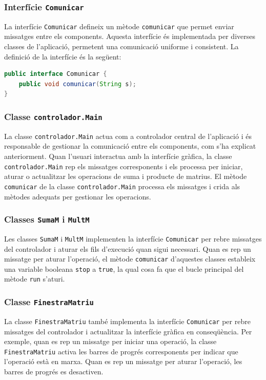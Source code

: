 \documentclass{ieeetj}
\begin{document}
\subsubsection{Interfície \texttt{Comunicar}}
La interfície \texttt{Comunicar} defineix un mètode \texttt{comunicar} que permet enviar missatges entre els components. Aquesta interfície és implementada per diverses classes de l'aplicació, permetent una comunicació uniforme i consistent. La definició de la interfície és la següent:

\begin{lstlisting}[language=Java, basicstyle=\ttfamily\normalsize]
public interface Comunicar {
    public void comunicar(String s);
}
\end{lstlisting}

\subsubsection{Classe \texttt{controlador.Main}}
La classe \texttt{controlador.Main} actua com a controlador central de l'aplicació i és responsable de gestionar la comunicació entre els components, com s'ha explicat anteriorment. Quan l'usuari interactua amb la interfície gràfica, la classe \texttt{controlador.Main} rep els missatges corresponents i els processa per iniciar, aturar o actualitzar les operacions de suma i producte de matrius. El mètode \texttt{comunicar} de la classe \texttt{controlador.Main} processa els missatges i crida als mètodes adequats per gestionar les operacions.

\subsubsection{Classes \texttt{SumaM} i \texttt{MultM}}
Les classes \texttt{SumaM} i \texttt{MultM} implementen la interfície \texttt{Comunicar} per rebre missatges del controlador i aturar els fils d'execució quan sigui necessari. Quan es rep un missatge per aturar l'operació, el mètode \texttt{comunicar} d'aquestes classes estableix una variable booleana \texttt{stop} a \texttt{true}, la qual cosa fa que el bucle principal del mètode \texttt{run} s'aturi.

\subsubsection{Classe \texttt{FinestraMatriu}}
La classe \texttt{FinestraMatriu} també implementa la interfície \texttt{Comunicar} per rebre missatges del controlador i actualitzar la interfície gràfica en conseqüència. Per exemple, quan es rep un missatge per iniciar una operació, la classe \texttt{FinestraMatriu} activa les barres de progrés corresponents per indicar que l'operació està en marxa. Quan es rep un missatge per aturar l'operació, les barres de progrés es desactiven.
\end{document}
